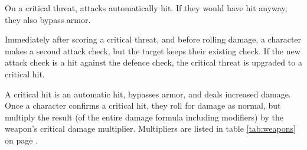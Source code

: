 \begin{multicols*}{2}
    On a critical threat, attacks automatically hit. If they would have hit
    anyway, they also bypass armor.

    Immediately after scoring a critical threat, and before rolling damage, a
    character makes a second attack check, but the target keeps their existing
    check. If the new attack check is a hit against the defence check, the
    critical threat is upgraded to a critical hit.

    A critical hit is an automatic hit, bypasses armor, and deals increased
    damage. Once a character confirms a critical hit, they roll for damage
    as normal, but multiply the result (of the entire damage formula including
    modifiers) by the weapon's critical damage multiplier. Multipliers are
    listed in table \ref{tab:weapons} on page \pageref{tab:weapons}.
\end{multicols*}
